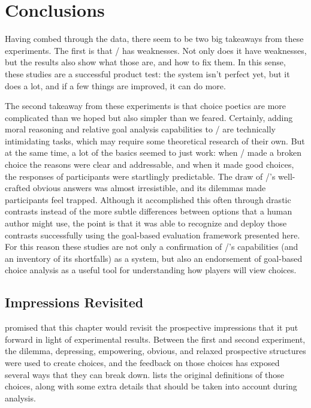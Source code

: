 \section{Conclusions}


Having combed through the data, there seem to be two big takeaways from these experiments.
%
The first is that \dunyazad/ has weaknesses.
%
Not only does it have weaknesses, but the results also show what those are, and how to fix them.
%
In this sense, these studies are a successful product test: the system isn't perfect yet, but it does a lot, and if a few things are improved, it can do more.


The second takeaway from these experiments is that choice poetics are more complicated than we hoped but also simpler than we feared.
%
Certainly, adding moral reasoning and relative goal analysis capabilities to \dunyazad/ are technically intimidating tasks, which may require some theoretical research of their own.
%
But at the same time, a lot of the basics seemed to just work: when \dunyazad/ made a broken choice the reasons were clear and addressable, and when it made good choices, the responses of participants were startlingly predictable.
%
The draw of \dunyazad/'s well-crafted obvious answers was almost irresistible, and its dilemmas made participants feel trapped.
%
Although it accomplished this often through drastic contrasts instead of the more subtle differences between options that a human author might use, the point is that it was able to recognize and deploy those contrasts successfully using the goal-based evaluation framework presented here.
%
For this reason these studies are not only a confirmation of \dunyazad/'s capabilities (and an inventory of its shortfalls) as a system, but also an endorsement of goal-based choice analysis as a useful tool for understanding how players will view choices.

\subsection{Impressions Revisited}

\label{sec:results-prospective-caveats}
\label{sec:results-retrospective-caveats}

 promised that this chapter would revisit the prospective impressions that it put forward in light of experimental results.
%
Between the first and second experiment, the dilemma, depressing, empowering, obvious, and relaxed prospective structures were used to create choices, and the feedback on those choices has exposed several ways that they can break down.
%
 lists the original definitions of those choices, along with some extra details that should be taken into account during analysis.


